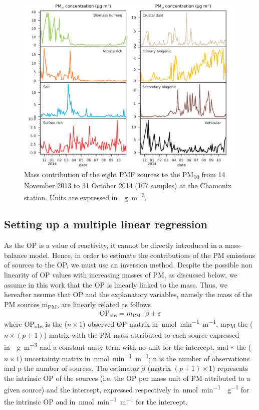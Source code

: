 \documentclass[acp, manuscript]{copernicus}
\begin{document}
\begin{figure}[h]
    \centering
    \includegraphics[width=\textwidth]{figures/fig03}
    \caption{Mass contribution of the eight PMF sources to the
    PM\textsubscript{10} from 14 November 2013 to 31 October 2014 (107 samples) at the
Chamonix station. Units are expressed in~\unit{\mu g~m^{-3}}.}
    \label{fig:PMFsrc}
\end{figure}

\subsection{Setting up a multiple linear
regression}\label{setting-up-a-multiple-linear-regression}

As the OP is a value of reactivity, it cannot be directly introduced in
a mass-balance model. Hence, in order to estimate the contributions of
the PM emissions of sources to the OP, we must use an inversion
method. Despite the possible non linearity of OP values with increasing
masses of PM, as discussed below, we assume in this work that the OP is
linearly linked to the mass. Thus, we hereafter assume that OP and the
explanatory variables, namely the mass of the PM sources
m\textsubscript{PM}, are linearly related as follows
\begin{equation}
    \text{OP}_{\text{obs}} = m_{\text{PM}} \cdot \beta + \varepsilon
    \label{eq:sys}
\end{equation}
where OP\textsubscript{obs} is the ($n\times1$) observed OP matrix in~\unit{nmol~min^{-1}~m^{-1}}, m\textsubscript{PM} the ($n\times(p+1)$)
matrix with the PM mass attributed to each source expressed in~\unit{\mu g~m^{-3}} and a constant unity term with no unit
for the intercept, and $\varepsilon$ the ($n\times1$) uncertainty matrix in~\unit{nmol~min^{-1}~m^{-1}}; n is the number of observations and
p the number of sources. The estimator $\beta$ (matrix $(p+1)\times1$) represents
the intrinsic OP of the sources (i.e. the OP per mass unit of PM
attributed to a given source) and the intercept, expressed respectively
in~\unit{nmol~min^{-1}~\mu g^{-1}} for the intrinsic OP and in~\unit{nmol~min^{-1}~m^{-1}} for the intercept.
\end{document}
